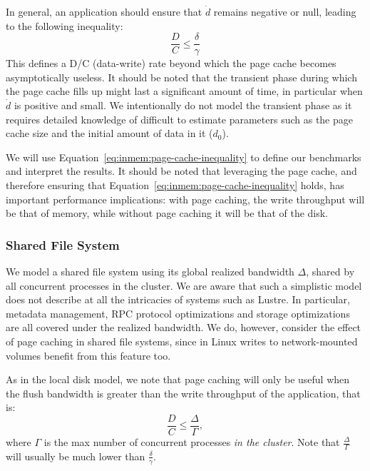 In general, an application should ensure that $\dot d$ remains negative or null,
leading to the following inequality:
\begin{equation}
\frac{D}{C} \leq \frac{\delta}{\gamma} \label{eq:inmem:page-cache-inequality}
\end{equation}
This defines a D/C (data-write) rate beyond which the page cache becomes
asymptotically useless. It should be noted that the transient phase during which
the page cache fills up might last a significant amount of time, in particular
when $\dot d$ is positive and small. We intentionally do not model the transient
phase as it requires detailed knowledge of difficult to estimate parameters  
such as the page cache size and the initial amount of data in it ($d_0$).

 We will use Equation~\ref{eq:inmem:page-cache-inequality} to define our benchmarks
and interpret the results. It should be noted that leveraging the page cache,
and therefore ensuring that Equation~\ref{eq:inmem:page-cache-inequality} holds, has
important performance implications: with page caching, the write throughput will
be that of memory, while without page caching it will be that of the disk.


\subsubsection{Shared File System}

We model a shared file system using its global realized bandwidth $\Delta$,
shared by all concurrent processes in the cluster. We are aware that such a
simplistic model does not describe at all the intricacies of systems such as
Lustre. In particular, metadata management, RPC protocol optimizations and
storage optimizations are all covered under the realized bandwidth. We do,
however, consider the effect of page caching in shared file systems, since in
Linux writes to network-mounted volumes benefit from this feature too.

As in the local disk model, we note that page caching will only be useful when
the flush bandwidth is greater than the write throughput of the application,
that is:
\begin{equation}
\frac{D}{C} \leq \frac{\Delta}{\Gamma}, \label{eq:inmem:page-cache-sharedfs}
\end{equation}
where $\Gamma$ is the max number of concurrent processes \emph{in the cluster}.
Note that $\frac{\Delta}{\Gamma}$ will usually be much lower than
$\frac{\delta}{\gamma}$.     


